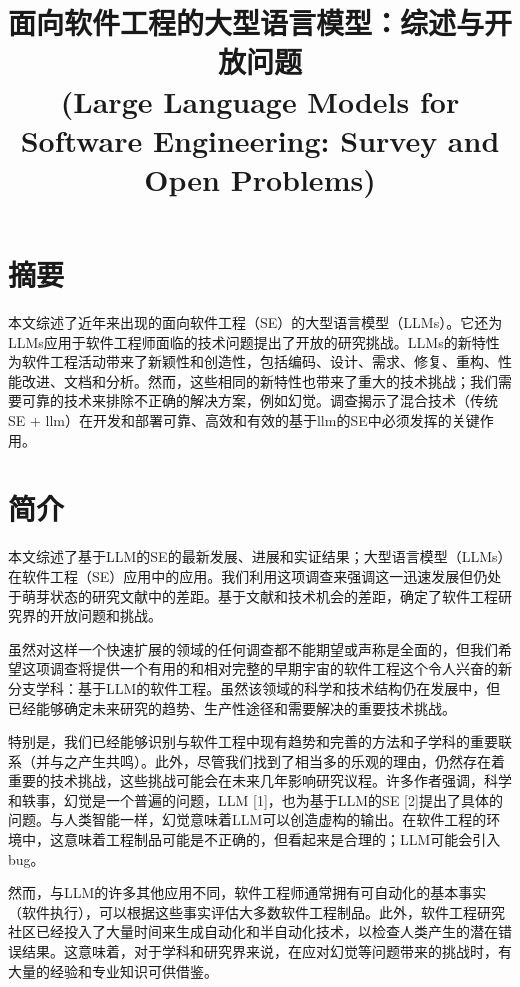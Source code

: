 
\begin{translation}
\label{cha:translation}

\title{面向软件工程的大型语言模型：综述与开放问题\\(Large Language Models for Software Engineering: Survey and Open Problems)}
\maketitle

\tableofcontents


\section{摘要}
本文综述了近年来出现的面向软件工程（SE）的大型语言模型（LLMs）。它还为LLMs应用于软件工程师面临的技术问题提出了开放的研究挑战。LLMs的新特性为软件工程活动带来了新颖性和创造性，包括编码、设计、需求、修复、重构、性能改进、文档和分析。然而，这些相同的新特性也带来了重大的技术挑战；我们需要可靠的技术来排除不正确的解决方案，例如幻觉。调查揭示了混合技术（传统SE + llm）在开发和部署可靠、高效和有效的基于llm的SE中必须发挥的关键作用。

\section{简介}
本文综述了基于LLM的SE的最新发展、进展和实证结果；大型语言模型（LLMs）在软件工程（SE）应用中的应用。我们利用这项调查来强调这一迅速发展但仍处于萌芽状态的研究文献中的差距。基于文献和技术机会的差距，确定了软件工程研究界的开放问题和挑战。

虽然对这样一个快速扩展的领域的任何调查都不能期望或声称是全面的，但我们希望这项调查将提供一个有用的和相对完整的早期宇宙的软件工程这个令人兴奋的新分支学科：基于LLM的软件工程。虽然该领域的科学和技术结构仍在发展中，但已经能够确定未来研究的趋势、生产性途径和需要解决的重要技术挑战。

特别是，我们已经能够识别与软件工程中现有趋势和完善的方法和子学科的重要联系（并与之产生共鸣）。此外，尽管我们找到了相当多的乐观的理由，仍然存在着重要的技术挑战，这些挑战可能会在未来几年影响研究议程。许多作者强调，科学和轶事，幻觉是一个普遍的问题，LLM [1]，也为基于LLM的SE [2]提出了具体的问题。与人类智能一样，幻觉意味着LLM可以创造虚构的输出。在软件工程的环境中，这意味着工程制品可能是不正确的，但看起来是合理的；LLM可能会引入bug。

然而，与LLM的许多其他应用不同，软件工程师通常拥有可自动化的基本事实（软件执行），可以根据这些事实评估大多数软件工程制品。此外，软件工程研究社区已经投入了大量时间来生成自动化和半自动化技术，以检查人类产生的潜在错误结果。这意味着，对于学科和研究界来说，在应对幻觉等问题带来的挑战时，有大量的经验和专业知识可供借鉴。


\end{translation}

